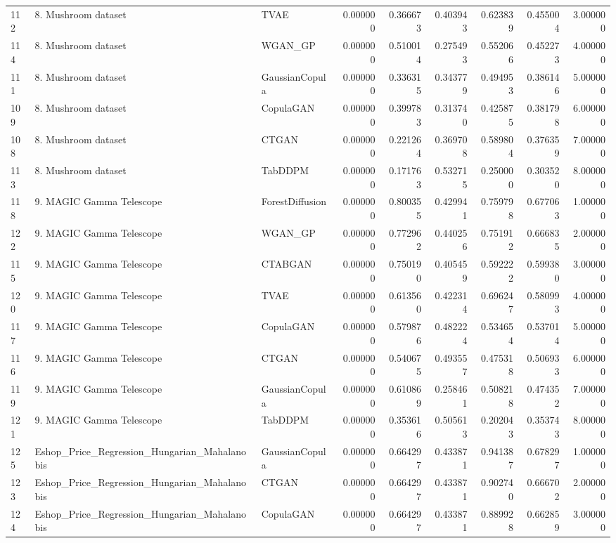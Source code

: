 \begin{tabular}{lllrrrrrr}
112 & 8. Mushroom dataset & TVAE & 0.000000 & 0.366673 & 0.403943 & 0.623839 & 0.455004 & 3.000000 \\
114 & 8. Mushroom dataset & WGAN_GP & 0.000000 & 0.510014 & 0.275493 & 0.552066 & 0.452273 & 4.000000 \\
111 & 8. Mushroom dataset & GaussianCopula & 0.000000 & 0.336315 & 0.343779 & 0.494953 & 0.386146 & 5.000000 \\
109 & 8. Mushroom dataset & CopulaGAN & 0.000000 & 0.399783 & 0.313740 & 0.425875 & 0.381798 & 6.000000 \\
108 & 8. Mushroom dataset & CTGAN & 0.000000 & 0.221264 & 0.369708 & 0.589804 & 0.376359 & 7.000000 \\
113 & 8. Mushroom dataset & TabDDPM & 0.000000 & 0.171763 & 0.532715 & 0.250000 & 0.303520 & 8.000000 \\
118 & 9. MAGIC Gamma Telescope & ForestDiffusion & 0.000000 & 0.800355 & 0.429941 & 0.759798 & 0.677063 & 1.000000 \\
122 & 9. MAGIC Gamma Telescope & WGAN_GP & 0.000000 & 0.772962 & 0.440256 & 0.751912 & 0.666835 & 2.000000 \\
115 & 9. MAGIC Gamma Telescope & CTABGAN & 0.000000 & 0.750190 & 0.405459 & 0.592222 & 0.599380 & 3.000000 \\
120 & 9. MAGIC Gamma Telescope & TVAE & 0.000000 & 0.613560 & 0.422314 & 0.696247 & 0.580993 & 4.000000 \\
117 & 9. MAGIC Gamma Telescope & CopulaGAN & 0.000000 & 0.579876 & 0.482224 & 0.534654 & 0.537014 & 5.000000 \\
116 & 9. MAGIC Gamma Telescope & CTGAN & 0.000000 & 0.540675 & 0.493557 & 0.475318 & 0.506933 & 6.000000 \\
119 & 9. MAGIC Gamma Telescope & GaussianCopula & 0.000000 & 0.610869 & 0.258461 & 0.508218 & 0.474352 & 7.000000 \\
121 & 9. MAGIC Gamma Telescope & TabDDPM & 0.000000 & 0.353616 & 0.505613 & 0.202043 & 0.353743 & 8.000000 \\
125 & Eshop_Price_Regression_Hungarian_Mahalanobis & GaussianCopula & 0.000000 & 0.664297 & 0.433871 & 0.941387 & 0.678297 & 1.000000 \\
123 & Eshop_Price_Regression_Hungarian_Mahalanobis & CTGAN & 0.000000 & 0.664297 & 0.433871 & 0.902740 & 0.666702 & 2.000000 \\
124 & Eshop_Price_Regression_Hungarian_Mahalanobis & CopulaGAN & 0.000000 & 0.664297 & 0.433871 & 0.889928 & 0.662859 & 3.000000 \\

\end{tabular}
